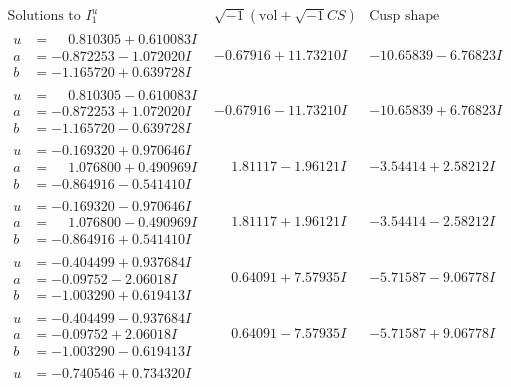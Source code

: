 \documentclass[1p]{elsarticle_modified}
\theoremstyle{definition}
\newcommand{\I}{\sqrt{-1}}
\begin{document}
$$\begin{array}{c|c|c}  
\text{Solutions to }I^u_{1}& \I (\text{vol} + \sqrt{-1}CS) & \text{Cusp shape}\\
 \hline 
\begin{aligned}
u &= \phantom{-}0.810305 + 0.610083 I \\
a &= -0.872253 - 1.072020 I \\
b &= -1.165720 + 0.639728 I\end{aligned}
 & -0.67916 + 11.73210 I & -10.65839 - 6.76823 I \\ \hline\begin{aligned}
u &= \phantom{-}0.810305 - 0.610083 I \\
a &= -0.872253 + 1.072020 I \\
b &= -1.165720 - 0.639728 I\end{aligned}
 & -0.67916 - 11.73210 I & -10.65839 + 6.76823 I \\ \hline\begin{aligned}
u &= -0.169320 + 0.970646 I \\
a &= \phantom{-}1.076800 + 0.490969 I \\
b &= -0.864916 - 0.541410 I\end{aligned}
 & \phantom{-}1.81117 - 1.96121 I & -3.54414 + 2.58212 I \\ \hline\begin{aligned}
u &= -0.169320 - 0.970646 I \\
a &= \phantom{-}1.076800 - 0.490969 I \\
b &= -0.864916 + 0.541410 I\end{aligned}
 & \phantom{-}1.81117 + 1.96121 I & -3.54414 - 2.58212 I \\ \hline\begin{aligned}
u &= -0.404499 + 0.937684 I \\
a &= -0.09752 - 2.06018 I \\
b &= -1.003290 + 0.619413 I\end{aligned}
 & \phantom{-}0.64091 + 7.57935 I & -5.71587 - 9.06778 I \\ \hline\begin{aligned}
u &= -0.404499 - 0.937684 I \\
a &= -0.09752 + 2.06018 I \\
b &= -1.003290 - 0.619413 I\end{aligned}
 & \phantom{-}0.64091 - 7.57935 I & -5.71587 + 9.06778 I \\ \hline\begin{aligned}
u &= -0.740546 + 0.734320 I \\

\end{aligned}
\end{array}$$
\end{document}
